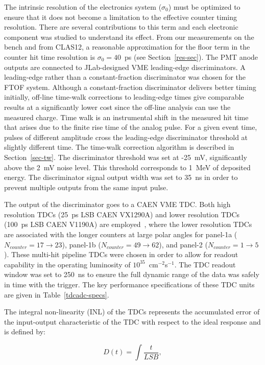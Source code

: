 \documentclass{elsart}
\begin{document}
The intrinsic resolution of the electronics system ($\sigma_0$) must be optimized to ensure that it does
not become a limitation to the effective counter timing resolution. There are several contributions to this
term and each electronic component was studied to understand its effect.  From our measurements on the
bench and from CLAS12, a reasonable approximation for the floor term in the counter hit time resolution
is $\sigma_0=40$~ps (see Section~\ref{res-sec}). The PMT anode outputs are connected to JLab-designed
VME leading-edge discriminators. A leading-edge rather than a constant-fraction discriminator was chosen
for the FTOF system. Although a constant-fraction discriminator delivers better timing initially, off-line
time-walk corrections to leading-edge times give comparable results at a significantly lower cost since the
off-line analysis can use the measured charge. Time walk is an instrumental shift in the measured hit time
that arises due to the finite rise time of the analog pulse. For a given event time, pulses of different
amplitude cross the leading-edge discriminator threshold at slightly different time. The time-walk correction
algorithm is described in Section~\ref{sec-tw}. The discriminator threshold was set at -25~mV, significantly
above the 2~mV noise level. This threshold corresponds to 1~MeV of deposited energy. The discriminator
signal output width was set to 35~ns in order to prevent multiple outputs from the same input pulse.

The output of the discriminator goes to a CAEN VME TDC. Both high resolution TDCs (25~ps LSB CAEN
VX1290A) and lower resolution TDCs (100~ps LSB CAEN V1190A) are employed~\cite{tdc-manual}, where
the lower resolution TDCs are associated with the longer counters at large polar angles for panel-1a
($N_{counter}=17 \to 23$), panel-1b ($N_{counter}=49 \to 62$), and panel-2 ($N_{counter}=1 \to 5$). These
multi-hit pipeline TDCs were chosen in order to allow for readout capability in the operating luminosity of
$10^{35}$~cm$^{-2}$s$^{-1}$. The TDC readout window was set to 250~ns to ensure the full dynamic range
of the data was safely in time with the trigger. The key performance specifications of these TDC units are
given in Table~\ref{tdcadc-specs}.

The integral non-linearity (INL) of the TDCs represents the accumulated error of the input-output
characteristic of the TDC with respect to the ideal response and is defined by:

\begin{equation}
D(t) = \int \frac{t}{LSB},
\end{equation}
\end{document}
